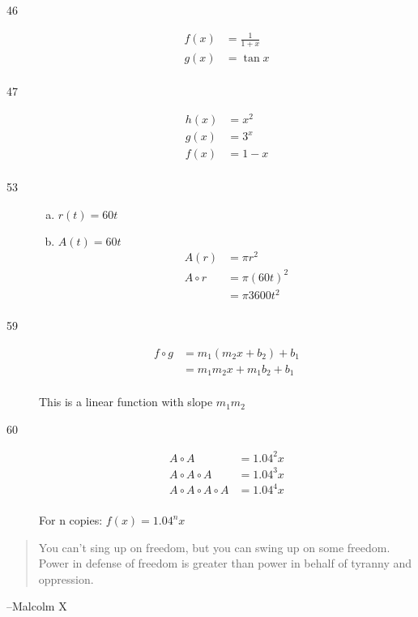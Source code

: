 \documentclass[letterpaper, landscape]{exam}
\begin{document}
\begin{description}
      \item[46]
        \begin{align*}
          f(x) &= \frac{1}{1 + x} \\
          g(x) &= \tan x \\
        \end{align*}

      \item[47]
        \begin{align*}
          h(x) &= x^2 \\
          g(x) &= 3^x \\
          f(x) &= 1 - x \\
        \end{align*}

      \item[53]
        \begin{enumerate}[(a)]
          \item $r(t) = 60t$

          \item $A(t) = 60t$
            \begin{align*}
              A(r)      & = \pi r^2 \\
              A \circ r & = \pi (60t)^2 \\
                        & = \pi 3600 t^2 \\
            \end{align*}
        \end{enumerate}

      \item[59]
        \begin{align*}
          f \circ g & = m_1 (m_2 x + b_2) + b_1 \\
                    & = m_1 m_2 x + m_1 b_2 + b_1 \\
        \end{align*}

        This is a linear function with slope $m_1 m_2$

      \item[60]
        \begin{align*}
          A \circ A & = 1.04^2 x \\
          A \circ A \circ A & = 1.04^3 x \\
          A \circ A \circ A \circ A & = 1.04^4 x \\
        \end{align*}

        For n copies: $f(x) = 1.04^n x$

    \end{description}

  \else
    \vspace{11 cm}
    \begin{quote}
      \begin{em}
        You can't sing up on freedom, but you can swing up on some freedom.
        Power in defense of freedom is greater than power in behalf of tyranny
        and oppression.
      \end{em}
    \end{quote}
    \hspace{1 cm} --Malcolm X
  \fi
\end{document}
